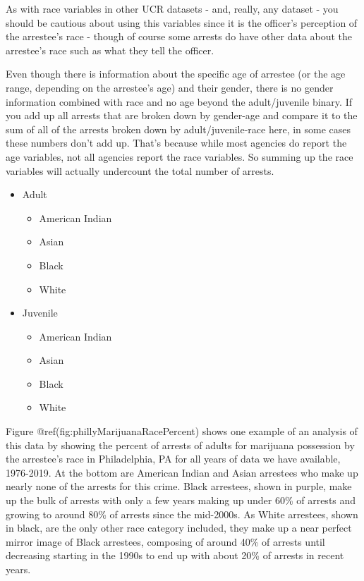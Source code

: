 \documentclass[
  12pt,
  openany]{book}
\providecommand{\tightlist}{%
  \setlength{\itemsep}{0pt}\setlength{\parskip}{0pt}}
\begin{document}
As with race variables in other UCR datasets - and, really, any dataset - you should be cautious about using this variables since it is the officer's perception of the arrestee's race - though of course some arrests do have other data about the arrestee's race such as what they tell the officer.

Even though there is information about the specific age of arrestee (or the age range, depending on the arrestee's age) and their gender, there is no gender information combined with race and no age beyond the adult/juvenile binary. If you add up all arrests that are broken down by gender-age and compare it to the sum of all of the arrests broken down by adult/juvenile-race here, in some cases these numbers don't add up. That's because while most agencies do report the age variables, not all agencies report the race variables. So summing up the race variables will actually undercount the total number of arrests.

\begin{itemize}
\tightlist
\item
  Adult

  \begin{itemize}
  \tightlist
  \item
    American Indian
  \item
    Asian
  \item
    Black
  \item
    White
  \end{itemize}
\item
  Juvenile

  \begin{itemize}
  \tightlist
  \item
    American Indian
  \item
    Asian
  \item
    Black
  \item
    White
  \end{itemize}
\end{itemize}

Figure @ref(fig:phillyMarijuanaRacePercent) shows one example of an analysis of this data by showing the percent of arrests of adults for marijuana possession by the arrestee's race in Philadelphia, PA for all years of data we have available, 1976-2019. At the bottom are American Indian and Asian arrestees who make up nearly none of the arrests for this crime. Black arrestees, shown in purple, make up the bulk of arrests with only a few years making up under 60\% of arrests and growing to around 80\% of arrests since the mid-2000s. As White arrestees, shown in black, are the only other race category included, they make up a near perfect mirror image of Black arrestees, composing of around 40\% of arrests until decreasing starting in the 1990s to end up with about 20\% of arrests in recent years.
\end{document}

